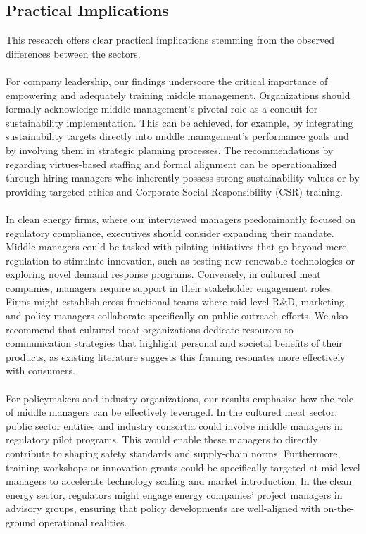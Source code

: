 	\subsection{Practical Implications}
	This research offers clear practical implications stemming from the observed differences between the sectors.
	
	\paragraph*{} For company leadership, our findings underscore the critical importance of empowering and adequately training middle management. Organizations should formally acknowledge middle management's pivotal role as a conduit for sustainability implementation. This can be achieved, for example, by integrating sustainability targets directly into middle management's performance goals and by involving them in strategic planning processes. The recommendations by \citeauthor{Posch2017} regarding virtues-based staffing and formal alignment can be operationalized through hiring managers who inherently possess strong sustainability values or by providing targeted ethics and Corporate Social Responsibility (CSR) training.
	
	\paragraph*{} In clean energy firms, where our interviewed managers predominantly focused on regulatory compliance, executives should consider expanding their mandate. Middle managers could be tasked with piloting initiatives that go beyond mere regulation to stimulate innovation, such as testing new renewable technologies or exploring novel demand response programs. Conversely, in cultured meat companies, managers require support in their stakeholder engagement roles. Firms might establish cross-functional teams where mid-level R\&D, marketing, and policy managers collaborate specifically on public outreach efforts. We also recommend that cultured meat organizations dedicate resources to communication strategies that highlight personal and societal benefits of their products, as existing literature suggests this framing resonates more effectively with consumers.
	
	\paragraph*{} For policymakers and industry organizations, our results emphasize how the role of middle managers can be effectively leveraged. In the cultured meat sector, public sector entities and industry consortia could involve middle managers in regulatory pilot programs. This would enable these managers to directly contribute to shaping safety standards and supply-chain norms. Furthermore, training workshops or innovation grants could be specifically targeted at mid-level managers to accelerate technology scaling and market introduction. In the clean energy sector, regulators might engage energy companies' project managers in advisory groups, ensuring that policy developments are well-aligned with on-the-ground operational realities.
	
